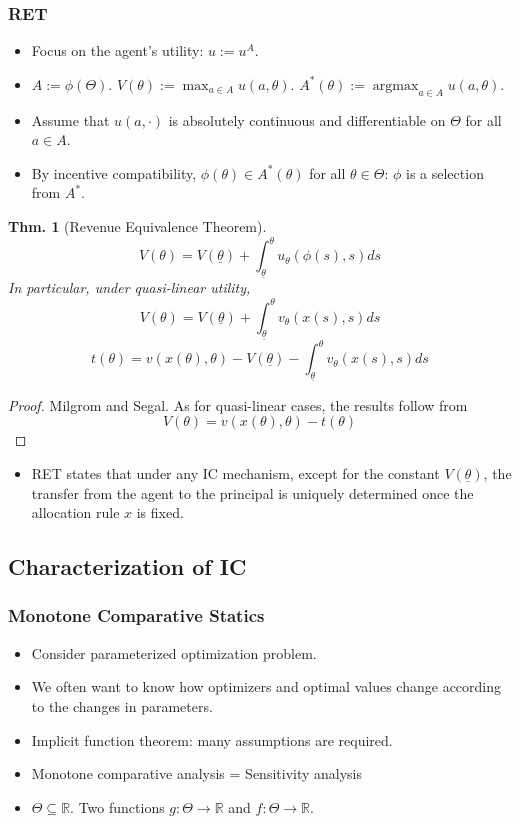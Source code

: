 \documentclass[11pt,a4paper,dvipdfmx]{article}
\theoremstyle{plain}
\newtheorem{thm}{Thm.}[section]
\newcommand{\R}{\mathbb{R}}
\newcommand{\1}{\mathbbm{1}}
\DeclareMathOperator*{\argmax}{argmax}
\begin{document}
\subsubsection{RET}
\begin{itemize}
	\item Focus on the agent's utility: $u := u^A$.
	\item $A := \phi(\Theta)$. $V(\theta) := \max_{a \in A} u(a, \theta)$. $A^*(\theta) := \argmax_{a \in A} u(a, \theta)$.
	\item Assume that $u(a, \cdot)$ is absolutely continuous and differentiable on $\Theta$ for all $a \in A$.
	\item By incentive compatibility, $\phi(\theta) \in A^*(\theta)$ for all $\theta \in \Theta$: $\phi$ is a selection from $A^*$.
\end{itemize}

\begin{thm}[Revenue Equivalence Theorem]
	\[
	V(\theta) = V(\underline{\theta}) + \int_{\underline{\theta}}^\theta
	 u_\theta(\phi(s), s) ds
	\]
	In particular, under quasi-linear utility, 
	\[
	V(\theta) = V(\underline{\theta}) + \int_{\underline{\theta}}^\theta
	 v_\theta(x(s), s) ds
	\]
	\[
	t(\theta) = v(x(\theta), \theta) - V(\underline{\theta}) - \int_{\underline{\theta}}^\theta
	 v_\theta(x(s), s) ds
	\]
\end{thm}
\begin{proof}
	Milgrom and Segal. As for quasi-linear cases, the results follow from
	$$
	V(\theta) = v(x(\theta), \theta) - t(\theta)
	$$
\end{proof}

\begin{itemize}
	\item RET states that under any IC mechanism, except for the constant $V(\underline{\theta})$, the transfer from the agent to the principal is uniquely determined once the allocation rule $x$ is fixed.
\end{itemize}

\subsection{Characterization of IC}
\subsubsection{Monotone Comparative Statics}
\begin{itemize}
	\item Consider parameterized optimization problem.
	\item We often want to know how optimizers and optimal values change according to the changes in parameters.
	\item Implicit function theorem: many assumptions are required.
	\item Monotone comparative analysis = Sensitivity analysis
	\item $\Theta \subseteq \R$. Two functions $g: \Theta \to \R$ and $f: \Theta \to \R$.
\end{itemize}
\end{document}
